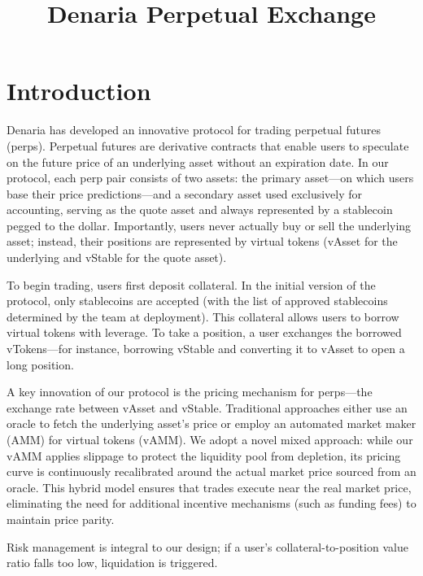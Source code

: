 \documentclass{article}
\begin{document}
\title{Denaria Perpetual Exchange}

\maketitle

\tableofcontents

\section{Introduction}

Denaria has developed an innovative protocol for trading perpetual futures (perps). Perpetual futures are derivative contracts that enable users to speculate on the future price of an underlying asset without an expiration date. In our protocol, each perp pair consists of two assets: the primary asset—on which users base their price predictions—and a secondary asset used exclusively for accounting, serving as the quote asset and always represented by a stablecoin pegged to the dollar. Importantly, users never actually buy or sell the underlying asset; instead, their positions are represented by virtual tokens (vAsset for the underlying and vStable for the quote asset).

To begin trading, users first deposit collateral. In the initial version of the protocol, only stablecoins are accepted (with the list of approved stablecoins determined by the team at deployment). This collateral allows users to borrow virtual tokens with leverage. To take a position, a user exchanges the borrowed vTokens—for instance, borrowing vStable and converting it to vAsset to open a long position.

A key innovation of our protocol is the pricing mechanism for perps—the exchange rate between vAsset and vStable. Traditional approaches either use an oracle to fetch the underlying asset’s price or employ an automated market maker (AMM) for virtual tokens (vAMM). We adopt a novel mixed approach: while our vAMM applies slippage to protect the liquidity pool from depletion, its pricing curve is continuously recalibrated around the actual market price sourced from an oracle. This hybrid model ensures that trades execute near the real market price, eliminating the need for additional incentive mechanisms (such as funding fees) to maintain price parity.

Risk management is integral to our design; if a user’s collateral-to-position value ratio falls too low, liquidation is triggered.
\end{document}
